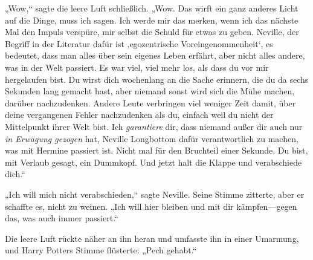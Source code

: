 „Wow,“ sagte die leere Luft schließlich. „Wow. Das wirft ein ganz anderes Licht auf die Dinge, muss ich sagen. Ich werde mir das merken, wenn ich das nächste Mal den Impuls verspüre, mir selbst die Schuld für etwas zu geben. Neville, der Begriff in der Literatur dafür ist ‚egozentrische Voreingenommenheit‘, es bedeutet, dass man alles über sein eigenes Leben erfährt, aber nicht alles andere, was in der Welt passiert. Es war viel, viel mehr los, als dass du vor mir hergelaufen bist. Du wirst dich wochenlang an die Sache erinnern, die du da sechs Sekunden lang gemacht hast, aber niemand sonst wird sich die Mühe machen, darüber nachzudenken. Andere Leute verbringen viel weniger Zeit damit, über deine vergangenen Fehler nachzudenken als du, einfach weil du nicht der Mittelpunkt ihrer Welt bist. Ich \emph{garantiere} dir, dass niemand außer dir auch nur \emph{in Erwägung gezogen} hat, Neville Longbottom dafür verantwortlich zu machen, was mit Hermine passiert ist. Nicht mal für den Bruchteil einer Sekunde. Du bist, mit Verlaub gesagt, ein Dummkopf. Und jetzt halt die Klappe und verabschiede dich.“

„Ich will mich nicht verabschieden,“ sagte Neville. Seine Stimme zitterte, aber er schaffte es, nicht zu weinen. „Ich will hier bleiben und mit dir kämpfen—gegen das, was auch immer passiert.“

Die leere Luft rückte näher an ihn heran und umfasste ihn in einer Umarmung, und Harry Potters Stimme flüsterte: „Pech gehabt.“

